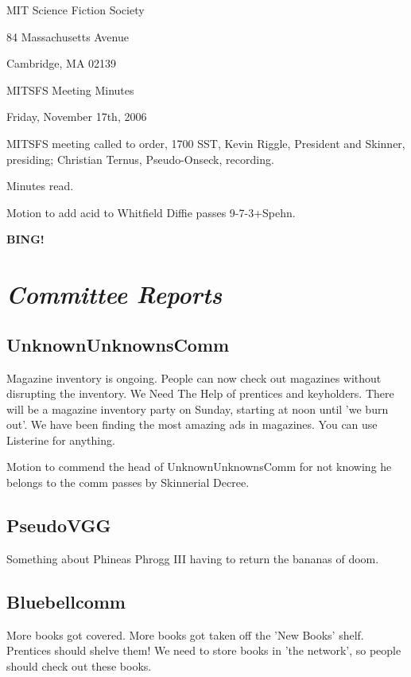 \documentclass[10pt]{article}
\newcommand{\bing}{{\bf BING!} }
\newcommand{\goto}[1]{\bing \vskip 12pt \section*{{\em{#1}}}}
\begin{document}
\begin{center}

MIT Science Fiction Society

84 Massachusetts Avenue

Cambridge, MA 02139

\vspace{12pt}

MITSFS Meeting Minutes

Friday, November 17th, 2006

\end{center}

\vspace{18pt}

\setlength{\parskip}{6pt}

\noindent
MITSFS meeting called to order, 1700 SST,
Kevin Riggle, President and Skinner, presiding; Christian Ternus, Pseudo-Onseck, recording.

Minutes read.

Motion to add acid to Whitfield Diffie passes 9-7-3+Spehn.

\goto{Committee Reports}

\subsection*{UnknownUnknownsComm}
Magazine inventory is ongoing. People can now check out magazines without disrupting the inventory. We Need The Help of prentices and keyholders. There will be a magazine inventory party on Sunday, starting at noon until 'we burn out'. We have been finding the most amazing ads in magazines. You can use Listerine for anything.

Motion to commend the head of UnknownUnknownsComm for not knowing he belongs to the comm passes by Skinnerial Decree.

\subsection*{PseudoVGG}
Something about Phineas Phrogg III having to return the bananas of doom.

\subsection*{Bluebellcomm}
More books got covered. More books got taken off the 'New Books' shelf. Prentices should shelve them! We need to store books in 'the network', so people should check out these books.
\end{document}
